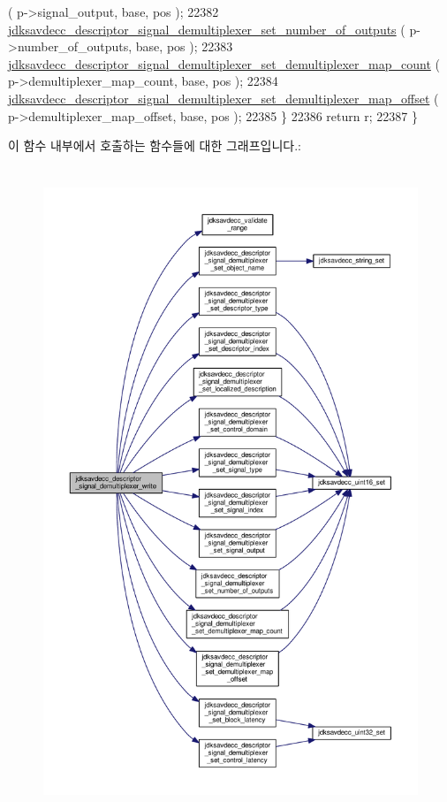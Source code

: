 \begin{DoxyCode}
      ( p->signal\_output, base, pos );
22382         \hyperlink{group__descriptor__signal__demultiplexer_gab7413cd1f548ab99b2c32ed05893b92b}{jdksavdecc\_descriptor\_signal\_demultiplexer\_set\_number\_of\_outputs}
      ( p->number\_of\_outputs, base, pos );
22383         \hyperlink{group__descriptor__signal__demultiplexer_gaeda002abf270e8faba453339b906743d}{jdksavdecc\_descriptor\_signal\_demultiplexer\_set\_demultiplexer\_map\_count}
      ( p->demultiplexer\_map\_count, base, pos );
22384         \hyperlink{group__descriptor__signal__demultiplexer_ga3a30e7f9e505bf0ea00404654a4e06e2}{jdksavdecc\_descriptor\_signal\_demultiplexer\_set\_demultiplexer\_map\_offset}
      ( p->demultiplexer\_map\_offset, base, pos );
22385     \}
22386     \textcolor{keywordflow}{return} r;
22387 \}
\end{DoxyCode}


이 함수 내부에서 호출하는 함수들에 대한 그래프입니다.\+:
\nopagebreak
\begin{figure}[H]
\begin{center}
\leavevmode
\includegraphics[height=550pt]{group__descriptor__signal__demultiplexer_gabc32ed4dbf67f627601c80e0decef375_cgraph}
\end{center}
\end{figure}


